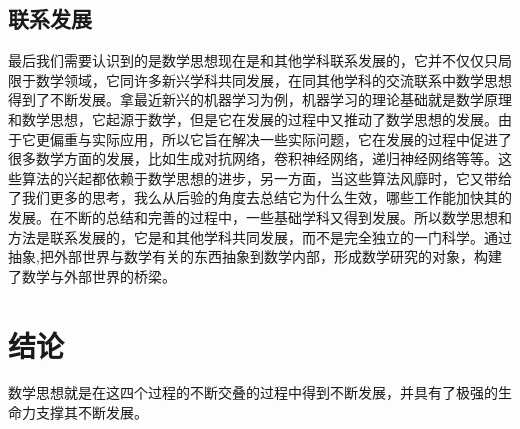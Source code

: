 \documentclass[UTF8,adobefonts]{ctexart}
\begin{document}
\subsection{联系发展}
最后我们需要认识到的是数学思想现在是和其他学科联系发展的，它并不仅仅只局限于数学领域，它同许多新兴学科共同发展，在同其他学科的交流联系中数学思想得到了不断发展\cite{才翰2006数学教育心理学}。拿最近新兴的机器学习为例，机器学习的理论基础就是数学原理和数学思想，它起源于数学，但是它在发展的过程中又推动了数学思想的发展。由于它更偏重与实际应用，所以它旨在解决一些实际问题，它在发展的过程中促进了很多数学方面的发展，比如生成对抗网络，卷积神经网络，递归神经网络等等。这些算法的兴起都依赖于数学思想的进步，另一方面，当这些算法风靡时，它又带给了我们更多的思考，我么从后验的角度去总结它为什么生效，哪些工作能加快其的发展。在不断的总结和完善的过程中，一些基础学科又得到发展。所以数学思想和方法是联系发展的，它是和其他学科共同发展，而不是完全独立的一门科学。通过抽象,把外部世界与数学有关的东西抽象到数学内部，形成数学研究的对象，构建了数学与外部世界的桥梁。
\section{结论}
数学思想就是在这四个过程的不断交叠的过程中得到不断发展，并具有了极强的生命力支撑其不断发展。



\end{document}
